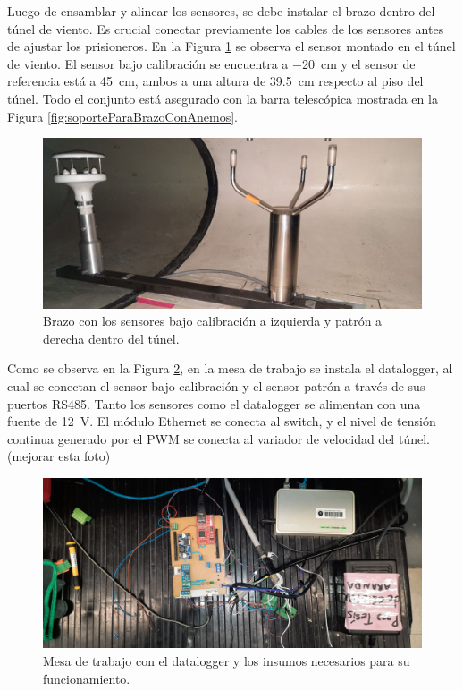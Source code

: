 Luego de ensamblar y alinear los sensores, se debe instalar el brazo dentro del túnel de viento. Es crucial conectar previamente los cables de los sensores antes de ajustar los prisioneros. En la Figura \ref{fig:deltaMontajeTunel} se observa el sensor montado en el túnel de viento. El sensor bajo calibración se encuentra a \SI{-20}{\centi\meter} y el sensor de referencia está a \SI{45}{\centi\meter}, ambos a una altura de \SI{39.5}{\centi\meter} respecto al piso del túnel. Todo el conjunto está asegurado con la barra telescópica mostrada en la Figura \ref{fig:soporteParaBrazoConAnemos}.


\begin{figure}[H]
    \centering
    \includegraphics[width=0.7\linewidth]{Figuras/resultados/calibracion/HD51_3/deltaMontajeTunel.jpg}
    \caption{Brazo con los sensores bajo calibración a izquierda y patrón a derecha dentro del túnel.}
    \label{fig:deltaMontajeTunel}
\end{figure}

Como se observa en la Figura \ref{fig:datalogger3}, en la mesa de trabajo se instala el datalogger, al cual se conectan el sensor bajo calibración y el sensor patrón a través de sus puertos RS485. Tanto los sensores como el datalogger se alimentan con una fuente de \SI{12}{\volt}. El módulo Ethernet se conecta al switch, y el nivel de tensión continua generado por el PWM se conecta al variador de velocidad del túnel.
(mejorar esta foto)
\begin{figure}[H]
    \centering
    \includegraphics[width=0.7\linewidth]{Figuras/resultados/calibracion/datalogger3.jpg}
    \caption{Mesa de trabajo con el datalogger y los insumos necesarios para su funcionamiento.}
    \label{fig:datalogger3}
\end{figure}

